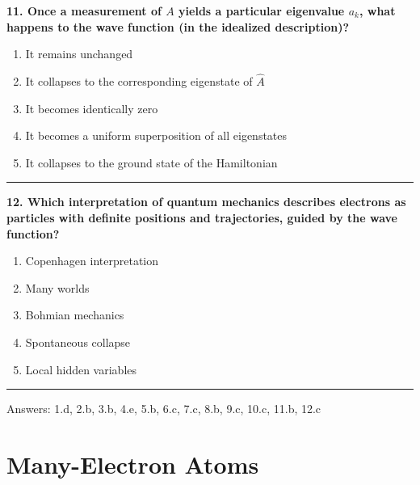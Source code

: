 \documentclass[
  english,
  9pt,
]{extbook}
\providecommand{\tightlist}{%
  \setlength{\itemsep}{0pt}\setlength{\parskip}{0pt}}
\theoremstyle{definition}
\theoremstyle{definition}
\theoremstyle{definition}
\theoremstyle{definition}
\theoremstyle{remark}
\begin{document}
\textbf{11. Once a measurement of \(A\) yields a particular eigenvalue \(a_k\), what happens to the wave function (in the idealized description)?}

\begin{enumerate}
\def\labelenumi{\alph{enumi}.}
\tightlist
\item
  It remains unchanged\\
\item
  It collapses to the corresponding eigenstate of \(\hat{A}\)\\
\item
  It becomes identically zero\\
\item
  It becomes a uniform superposition of all eigenstates\\
\item
  It collapses to the ground state of the Hamiltonian
\end{enumerate}

\begin{center}\rule{0.5\linewidth}{0.5pt}\end{center}

\textbf{12. Which interpretation of quantum mechanics describes electrons as particles with definite positions and trajectories, guided by the wave function?}

\begin{enumerate}
\def\labelenumi{\alph{enumi}.}
\tightlist
\item
  Copenhagen interpretation\\
\item
  Many worlds\\
\item
  Bohmian mechanics\\
\item
  Spontaneous collapse\\
\item
  Local hidden variables
\end{enumerate}

\begin{center}\rule{0.5\linewidth}{0.5pt}\end{center}

Answers: 1.d, 2.b, 3.b, 4.e, 5.b, 6.c, 7.c, 8.b, 9.c, 10.c, 11.b, 12.c

\chapter{Many-Electron Atoms}\label{Atoms}
\end{document}
